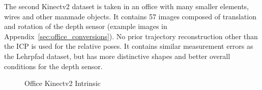 The second Kinectv2 dataset is taken in an office with many smaller elements, wires and other manmade objects.
It contains 57 images composed of translation and rotation of the depth sensor (example images in Appendix~\ref{sec:office_conversions}).
No prior trajectory reconstruction other than the ICP is used for the relative poses.
It contains similar measurement errors as the Lehrpfad dataset, but has more distinctive shapes and better overall conditions for the depth sensor.
\begin{figure}[H]
\CenterFloatBoxes%
\begin{floatrow}
{\caption{Office Kinectv2 Intrinsic}\label{tab:office_intrinsic}}%
\end{floatrow}
\end{figure}
